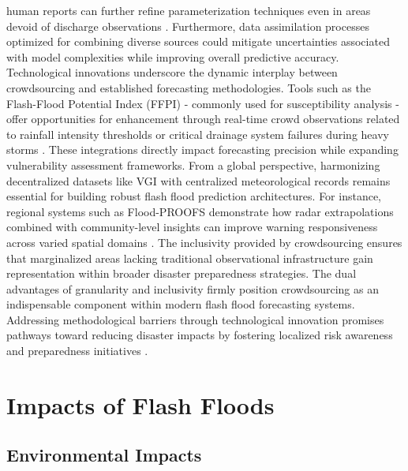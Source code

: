 human reports can further refine parameterization techniques even in areas devoid of discharge observations \citep{Silvestro2017}. Furthermore, data assimilation processes optimized for combining diverse sources could mitigate uncertainties associated with model complexities while improving overall predictive accuracy. Technological innovations underscore the dynamic interplay between crowdsourcing and established forecasting methodologies. Tools such as the Flash-Flood Potential Index (FFPI) - commonly used for susceptibility analysis - offer opportunities for enhancement through real-time crowd observations related to rainfall intensity thresholds or critical drainage system failures during heavy storms \citep{Lu2021}. These integrations directly impact forecasting precision while expanding vulnerability assessment frameworks. From a global perspective, harmonizing decentralized datasets like VGI with centralized meteorological records remains essential for building robust flash flood prediction architectures. For instance, regional systems such as Flood-PROOFS demonstrate how radar extrapolations combined with community-level insights can improve warning responsiveness across varied spatial domains \citep{Zanchetta2020}. The inclusivity provided by crowdsourcing ensures that marginalized areas lacking traditional observational infrastructure gain representation within broader disaster preparedness strategies. The dual advantages of granularity and inclusivity firmly position crowdsourcing as an indispensable component within modern flash flood forecasting systems. Addressing methodological barriers through technological innovation promises pathways toward reducing disaster impacts by fostering localized risk awareness and preparedness initiatives \citep{Lowrie2022}\citep{Zhang2022}\citep{Ngo2018}\citep{Silvestro2017}.

\section{Impacts of Flash Floods}

\subsection{Environmental Impacts}
